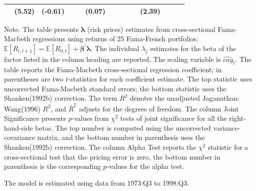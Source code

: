 \documentclass[12pt]{article}
\newcommand{\E}{\mathbb{E}}
\begin{document}
\begin{landscape}
\begin{threeparttable}[htbp]
\begin{tabular}{lccccccccccccc}
   & (5.52) & (-0.61) &  &  & (0.07) &  &  &  &  & (2.39) &  &  &  \\ 
\bottomrule
\end{tabular}
\begin{tablenotes}\footnotesize
 \item \quad Note. The table presents $\bm{\lambda}$ (risk prices) estimates from cross-sectional Fama-Macbeth regressions using returns of 25 Fama-French portfolios: $\E[R_{i,t+1}] = \E[R_{0,t}] + \bm{\beta}^{\prime} \bm{\lambda} $. The individual $\lambda_j$ estimates for the beta of the factor listed in the column heading are reported. The scaling variable is $\widehat{cay}_t$. The table reports the Fama-Macbeth cross-sectional regression coefficient; in parentheses are two  $t$-statistics for each coefficient estimate. The top statistic uses uncorrected Fama-Macbeth standard errors; the bottom statistic uses the Shanken(1992b) correction. The term $R^2$ denotes the unadjusted Jaganathan-Wang(1996) $R^2$, and $\bar{R}^2$ adjusts for the degrees of freedom. The column Joint Significance presents $p$-values from $\chi^2$ tests of joint significance for all the right-hand-side betas. The top number is computed using the uncorrected variance-covariance matrix, and the bottom number in parenthesis uses the Shanken(1992b) correction. The column Alpha Test reports the $\chi^2$ statistic for a cross-sectional test that the pricing error is zero, the bottom number in parenthesis is the corresponding $p$-values for the alpha test. 
 \item \quad The model is estimated using data from 1973:Q3 to 1998:Q3. 
\end{tablenotes}
\end{threeparttable}
\end{landscape}
\end{document}
